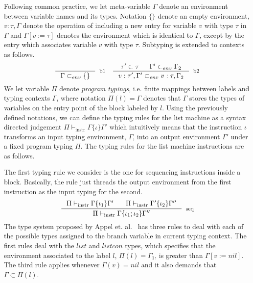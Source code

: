 \documentclass[sigconf]{acmart}
\theoremstyle{definition}
\begin{document}
Following common practice, we let meta-variable $\Gamma$ denote an
environment between variable names and
its types. Notation $\{\}$ denote an empty environment, $v : \tau , \Gamma$
denote the operation of including a new entry for variable $v$ with type $\tau$
in $\Gamma$ and $\Gamma [v := \tau]$ denotes the environment which is identical to $\Gamma$, except
by the entry which associates variable $v$ with type $\tau$.
Subtyping is extended to contexts as follows.
\[
\begin{array}{cc}
  \inference{}
            {\Gamma \subset_{env} \{\}}[b1]
  &
  \inference{\tau' \subset \tau & \Gamma' \subset_{env} \Gamma_2}
            {v : \tau' , \Gamma' \subset_{env} v : \tau , \Gamma_2}
            [b2]
\end{array}
\]
We let variable $\Pi$ denote \emph{program typings}, i.e. finite mappings between
labels and typing contexts $\Gamma$, where notation $\Pi(l) = \Gamma$ denotes that
$\Gamma$ stores the types of variables on the entry point of the block labeled by $l$.
Using the previously defined notations, we can define the typing rules for the list
machine as a syntax directed judgement $\Pi \vdash_{\text{instr}} \Gamma \{ \iota \} \Gamma'$
which intuitively means that the instruction $\iota$ transforms an input typing environment,
$\Gamma$, into an output environment $\Gamma'$ under a fixed program typing $\Pi$. The typing
rules for the list machine instructions are as follows.

The first typing rule we consider is the one for sequencing instructions inside a block. Basically,
the rule just threads the output environment from the first instruction as the input typing for the
second.
\[
\inference{\Pi \vdash_{\text{instr}} \Gamma\{ \iota_1 \}\Gamma'\:\:\:\:\:\:\:\:\Pi \vdash_{\text{instr}} \Gamma'\{ \iota_2 \}\Gamma''}
          {\Pi \vdash_{\text{instr}} \Gamma\{ \iota_1 ; \iota_2 \}\Gamma''}[seq]
\]
The type system proposed by Appel et. al.~\cite{Appel07} has three rules to deal with each of the possible
types assigned to the branch variable in current typing context. The first rules deal with the $list$ and $listcon$
types, which specifies that the environment associated to the label $l$, $\Pi(l) = \Gamma_1$, is greater than
$\Gamma[v := nil]$. The third rule applies whenever $\Gamma(v) = nil$ and it also demands that $\Gamma \subset \Pi(l)$.
\end{document}

